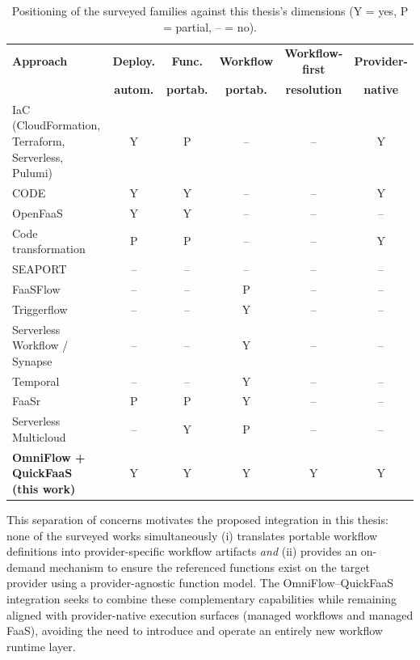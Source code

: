 \begin{table}[htbp]
  \centering
  \caption{Positioning of the surveyed families against this thesis's dimensions
  (Y = yes, P = partial, -- = no).}
  \label{tab:related-comparison}
  \begin{tabular}{lccccc}
    \hline
    \textbf{Approach} & \textbf{Deploy.} & \textbf{Func.} & \textbf{Workflow} & \textbf{Workflow-first} & \textbf{Provider-} \\
     & \textbf{autom.} & \textbf{portab.} & \textbf{portab.} & \textbf{resolution} & \textbf{native} \\
    \hline
    IaC (CloudFormation, Terraform, Serverless, Pulumi) & Y & P & -- & -- & Y \\
    CODE~\cite{ristov2024code}                          & Y & Y & -- & -- & Y \\
    OpenFaaS~\cite{openFaaS}                            & Y & Y & -- & -- & -- \\
    Code transformation~\cite{spillner2017pythonfaas,spillnerDorodko2017javaLambda} & P & P & -- & -- & Y \\
    SEAPORT~\cite{yussupov2020seaport}                  & -- & -- & -- & -- & -- \\
    FaaSFlow~\cite{li2022faasflow}                      & -- & -- & P & -- & -- \\
    Triggerflow~\cite{garciaLopez2020triggerflow}       & -- & -- & Y & -- & -- \\
    Serverless Workflow / Synapse~\cite{serverlessWorkflowSpec,serverlessworkflowSynapse} & -- & -- & Y & -- & -- \\
    Temporal~\cite{temporalPlatform}                    & -- & -- & Y & -- & -- \\
    FaaSr~\cite{park2024faasr}                          & P & P & Y & -- & -- \\
    Serverless Multicloud~\cite{zhao2022supporting}     & -- & Y & P & -- & -- \\
    \textbf{OmniFlow + QuickFaaS (this work)}           & Y & Y & Y & Y & Y \\
    \hline
  \end{tabular}
\end{table}

This separation of concerns motivates the proposed integration in this thesis: none of the surveyed works simultaneously (i) translates portable workflow definitions into provider-specific workflow artifacts \emph{and} (ii) provides an on-demand mechanism to ensure the referenced functions exist on the target provider using a provider-agnostic function model.
The OmniFlow--QuickFaaS integration seeks to combine these complementary capabilities while remaining aligned with provider-native execution surfaces (managed workflows and managed FaaS), avoiding the need to introduce and operate an entirely new workflow runtime layer.
